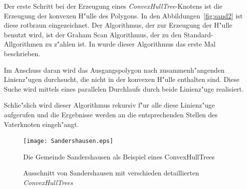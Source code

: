 Der erste Schritt bei der Erzeugung eines \textit{ConvexHullTree}-Knotens ist die Erzeugung der konvexen H"ulle des Polygons. In den Abbildungen~\vref{fig:sand2} ist diese rotbraun eingezeichnet. Der Algorithmus, der zur Erzeugung der H"ulle benutzt wird, ist der Graham Scan Algorithmus, der zu den Standard-Allgorithmen zu z"ahlen ist. In \cite{G72} wurde dieser Algorithmus das erste Mal beschrieben.

Im Anschuss daran wird das Ausgangspolygon nach zusammenh"angenden Linienz"ugen durchsucht, die nicht in der konvexen H"ulle enthalten sind. Diese Suche wird mittels eines parallelen Durchlaufs durch beide Linienz"uge realisiert.

Schlie"slich wird dieser Algorithmus rekursiv f"ur alle diese Linienz"uge aufgerufen und die Ergebnisse werden an die entsprechenden Stellen des Vaterknoten eingeh"angt.

\begin{figure}
	\centering
	\texttt{[image: Sandershausen.eps]}
	\caption{Die Gemeinde Sandershausen als Beispiel eines ConvexHullTrees}
	\label{fig:Sanders}
\end{figure}
\begin{figure}
\hfill
{}
\caption[verschieden detaillierte \textit{ConvexHullTrees}]{Ausschnitt von Sandershausen mit verschieden detaillierten \textit{ConvexHullTrees}}
\label{fig:sand2}
\end{figure}

